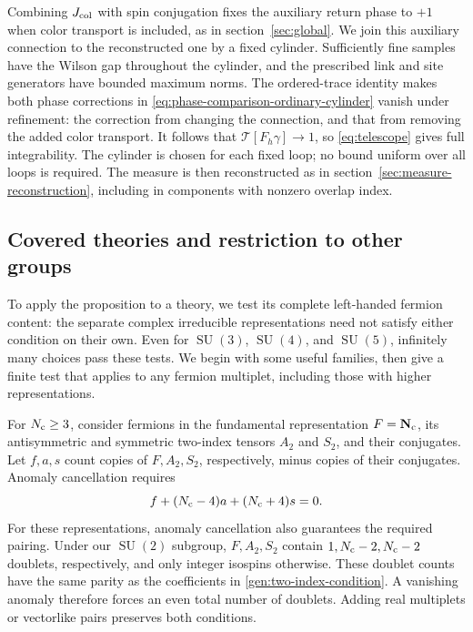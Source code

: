 \documentclass[11pt,a4paper]{article}
\theoremstyle{remark}
\DeclareMathOperator{\SU}{SU}
\begin{document}
Combining $J_{\rm col}$ with spin conjugation fixes the auxiliary return
phase to $+1$ when color transport is included, as in
section~\ref{sec:global}. We join this auxiliary connection to the
reconstructed one by a fixed cylinder. Sufficiently
fine samples have the Wilson gap throughout the cylinder, and the
prescribed link and site generators have bounded maximum norms.
The ordered-trace identity makes both phase corrections in
\eqref{eq:phase-comparison-ordinary-cylinder} vanish under refinement:
the correction from changing the connection, and that from removing
the added color transport. It follows that
$\mathcal T[F_h\gamma]\to1$, so \eqref{eq:telescope} gives full
integrability. The cylinder is chosen for each fixed loop; no bound
uniform over all loops is required. The measure is then reconstructed
as in section~\ref{sec:measure-reconstruction}, including in components
with nonzero overlap index.

\subsection{Covered theories and restriction to other groups}

To apply the proposition to a theory, we test its complete left-handed
fermion content: the separate complex irreducible representations need
not satisfy either condition on their own. Even for $\SU(3)$,
$\SU(4)$, and $\SU(5)$, infinitely many choices pass these tests.
We begin with some useful families, then give a finite test that applies
to any fermion multiplet, including those with higher representations.

For $N_{\rm c}\ge3$, consider fermions in the fundamental representation
$F=\mathbf{N_{\rm c}}$, its antisymmetric and symmetric two-index
tensors $A_2$ and $S_2$, and their conjugates. Let $f,a,s$ count copies
of $F,A_2,S_2$, respectively, minus copies of their conjugates. Anomaly
cancellation requires
\begin{equation}
 f+(N_{\rm c}-4)a+(N_{\rm c}+4)s=0.
 \label{gen:two-index-condition}
\end{equation}
For these representations, anomaly cancellation also guarantees the
required pairing. Under our $\SU(2)$ subgroup, $F,A_2,S_2$ contain
$1,N_{\rm c}-2,N_{\rm c}-2$ doublets, respectively, and only integer
isospins otherwise. These doublet counts have the same parity as the
coefficients in \eqref{gen:two-index-condition}. A vanishing anomaly
therefore forces an even total number of doublets. Adding real
multiplets or vectorlike pairs preserves both conditions.
\end{document}
